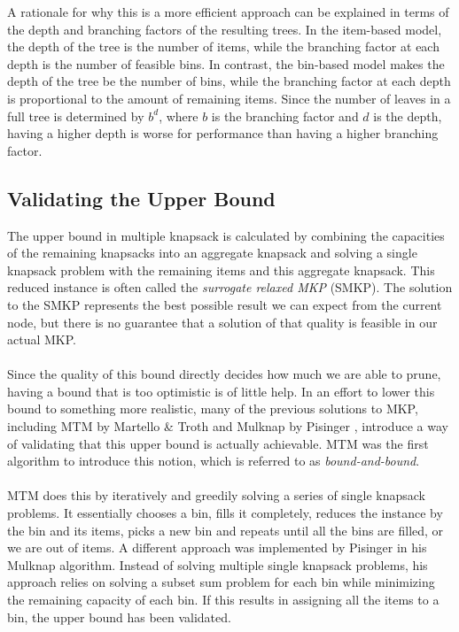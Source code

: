 \documentclass[b5paper]{article}
\begin{document}
A rationale for why this is a more efficient approach can be explained in terms of the depth and branching factors of the resulting trees.
In the item-based model, the depth of the tree is the number of items, while the branching factor at each depth is the number of feasible bins.
In contrast, the bin-based model makes the depth of the tree be the number of bins, while the branching factor at each depth is proportional to the amount of remaining items.
Since the number of leaves in a full tree is determined by $b^d$, where $b$ is the branching factor and $d$ is the depth,
having a higher depth is worse for performance than having a higher branching factor.

\subsection{Validating the Upper Bound}
The upper bound in multiple knapsack is calculated by combining the capacities of the remaining knapsacks into an aggregate knapsack and solving a single knapsack problem with the remaining items and this aggregate knapsack.
This reduced instance is often called the \emph{surrogate relaxed MKP} (SMKP).
The solution to the SMKP represents the best possible result we can expect from the current node, but there is no guarantee that a solution of that quality is feasible in our actual MKP.
\\ \\
Since the quality of this bound directly decides how much we are able to prune, having a bound that is too optimistic is of little help.
In an effort to lower this bound to something more realistic, many of the previous solutions to MKP, including MTM by Martello \& Troth \cite{martello_bound_1981} and Mulknap by Pisinger \cite{pisinger_exact_nodate},
introduce a way of validating that this upper bound is actually achievable. MTM was the first algorithm to introduce this notion, which is referred to as \emph{bound-and-bound}.
\\ \\
MTM does this by iteratively and greedily solving a series of single knapsack problems.
It essentially chooses a bin, fills it completely, reduces the instance by the bin and its items, picks a new bin and repeats until all the bins are filled, or we are out of items.
A different approach was implemented by Pisinger in his Mulknap algorithm.
Instead of solving multiple single knapsack problems, his approach relies on solving a subset sum problem for each bin while minimizing the remaining capacity of each bin.
If this results in assigning all the items to a bin, the upper bound has been validated.
\end{document}
